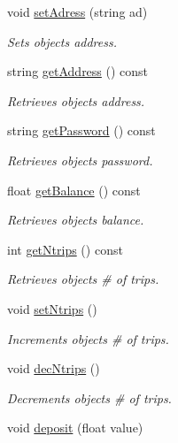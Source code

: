 \begin{Indent}
\begin{DoxyCompactItemize}
void \hyperlink{group___user_ga02324144fd363369f11b7aca8f117865}{set\+Adress} (string ad)
\begin{DoxyCompactList}\small\item\em Sets object\textquotesingle{}s address. \end{DoxyCompactList}\item 
string \hyperlink{group___user_gaef1759300db1bca3c84af6af79f00365}{get\+Address} () const
\begin{DoxyCompactList}\small\item\em Retrieves object\textquotesingle{}s address. \end{DoxyCompactList}\item 
string \hyperlink{group___user_ga33429bdd1253091697a9c5c5e1448bee}{get\+Password} () const
\begin{DoxyCompactList}\small\item\em Retrieves object\textquotesingle{}s password. \end{DoxyCompactList}\item 
float \hyperlink{group___user_ga713b20a844b9e70630a50dd5f1357d95}{get\+Balance} () const
\begin{DoxyCompactList}\small\item\em Retrieves object\textquotesingle{}s balance. \end{DoxyCompactList}\item 
int \hyperlink{group___user_gadfbbdc7ea72e051b7b7b8d41c14eb846}{get\+Ntrips} () const
\begin{DoxyCompactList}\small\item\em Retrieves object\textquotesingle{}s \# of trips. \end{DoxyCompactList}\item 
void \hyperlink{group___user_ga738dab753a5a3ba6e1315caaf4765a24}{set\+Ntrips} ()
\begin{DoxyCompactList}\small\item\em Increments object\textquotesingle{}s \# of trips. \end{DoxyCompactList}\item 
void \hyperlink{group___user_ga0b5d245f2e517c697493264e0a1e5642}{dec\+Ntrips} ()
\begin{DoxyCompactList}\small\item\em Decrements object\textquotesingle{}s \# of trips. \end{DoxyCompactList}\item 
void \hyperlink{group___user_gafe73f0b48d4aa29e9205f706a21b7068}{deposit} (float value)

\end{DoxyCompactItemize}
\end{Indent}
